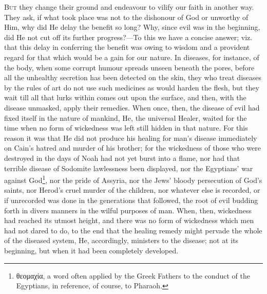 
\textsc{But} they change their ground and endeavour to vilify our faith in another way. They ask, if what took place was not to the dishonour of God or unworthy of Him, why did He delay the benefit so long? Why, since evil was in the beginning, did He not cut off its further progress?—To this we have a concise answer; viz. that this delay in conferring the benefit was owing to wisdom and a provident regard for that which would be a gain for our nature. In diseases, for instance, of the body, when some corrupt humour spreads unseen beneath the pores, before all the unhealthy secretion has been detected on the skin, they who treat diseases by the rules of art do not use such medicines as would harden the flesh, but they wait till all that lurks within comes out upon the surface, and then, with the disease unmasked, apply their remedies. When once, then, the disease of evil had fixed itself in the nature of mankind, He, the universal Healer, waited for the time when no form of wickedness was left still hidden in that nature. For this reason it was that He did not produce his healing for man’s disease immediately on Cain’s hatred and murder of his brother; for the wickedness of those who were destroyed in the days of Noah had not yet burst into a flame, nor had that terrible disease of Sodomite lawlessness been displayed, nor the Egyptians’ war against God\footnote{\textgreek{θεομαχία}, a word often applied by the Greek Fathers to the conduct of the Egyptians, in reference, of course, to Pharaoh.}, nor the pride of Assyria, nor the Jews’ bloody persecution of God’s saints, nor Herod’s cruel murder of the children, nor whatever else is recorded, or if unrecorded was done in the generations that followed, the root of evil budding forth in divers manners in the wilful purposes of man. When, then, wickedness had reached its utmost height, and there was no form of wickedness which men had not dared to do, to the end that the healing remedy might pervade the whole of the diseased system, He, accordingly, ministers to the disease; not at its beginning, but when it had been completely developed.


